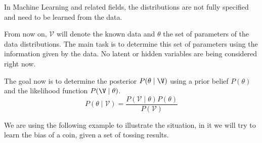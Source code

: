 
In Machine Learning and related fields, the distributions are not fully specified
and need to be learned from the data.

From now on, \(\mathcal{V}\) will denote the known data and \(\theta\) the set
of parameters of the data distributions. The main task is to determine this set
of parameters using the information given by the data. No latent or hidden variables are being considered right now.

The goal now is to determine the posterior \(P(\theta \mid \V)\) using a prior belief \(P(\theta)\) and the likelihood function \(P(\V \mid \theta)\).  
\[
  P(\theta \mid  \mathcal{V}) = \frac{P(\mathcal{V}  \mid  \theta)P(\theta)}{P(\mathcal{V})}
\]

We are using the following example to illustrate the situation, in it we will try to learn the bias of a coin, given a set of tossing results.


